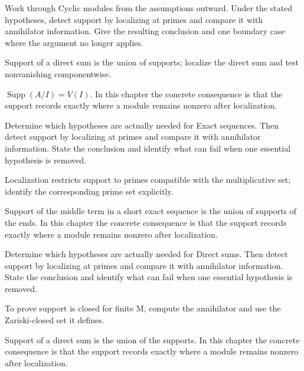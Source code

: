 \begin{exercise}\label{exr:v16-04}
Work through Cyclic modules from the assumptions outward. Under the stated hypotheses, detect support by localizing at primes and compare it with annihilator information. Give the resulting conclusion and one boundary case where the argument no longer applies.
\end{exercise}
\begin{hint}
Support of a direct sum is the union of supports; localize the direct sum and test nonvanishing componentwise.
\end{hint}
\begin{solution}
$\operatorname{Supp}(A/I)=V(I)$. In this chapter the concrete consequence is that the support records exactly where a module remains nonzero after localization.
\end{solution}

\begin{exercise}\label{exr:v16-05}
Determine which hypotheses are actually needed for Exact sequences. Then detect support by localizing at primes and compare it with annihilator information. State the conclusion and identify what can fail when one essential hypothesis is removed.
\end{exercise}
\begin{hint}
Localization restricts support to primes compatible with the multiplicative set; identify the corresponding prime set explicitly.
\end{hint}
\begin{solution}
Support of the middle term in a short exact sequence is the union of supports of the ends. In this chapter the concrete consequence is that the support records exactly where a module remains nonzero after localization.
\end{solution}

\begin{exercise}\label{exr:v16-06}
Determine which hypotheses are actually needed for Direct sums. Then detect support by localizing at primes and compare it with annihilator information. State the conclusion and identify what can fail when one essential hypothesis is removed.
\end{exercise}
\begin{hint}
To prove support is closed for finite M, compute the annihilator and use the Zariski-closed set it defines.
\end{hint}
\begin{solution}
Support of a direct sum is the union of the supports. In this chapter the concrete consequence is that the support records exactly where a module remains nonzero after localization.
\end{solution}

